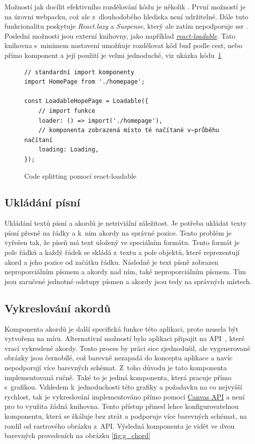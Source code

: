 Možností jak docílit efektivního rozdělování kódu je několik \cite{facebookinc_2018_codesplitting}. První možností je na úrovni webpacku, což ale z~dlouhodobého hlediska není udržitelné. Dále tuto funkcionalitu poskytuje \emph{React.lazy} a \emph{Suspense}, který ale zatím nepodporuje \acrshort{ssr} \cite{facebookinc_2018_codesplitting}. Poslední možnosti jsou externí knihovny, jako například \href{https://github.com/jamiebuilds/react-loadable}{\emph{react-loadable}}. Tato knihovna s~minimem nastavení umožňuje rozdělovat kód buď podle cest, nebo přímo komponent a její použití je velmi jednoduché, viz ukázka kódu~\ref{code:code_splitting}

\begin{figure}[h!]
    \centering
    \begin{verbatim}
// standardní import komponenty
import HomePage from './homepage';

const LoadableHopePage = Loadable({
    // import funkce
    loader: () => import('./homepage'),
    // komponenta zobrazená místo té načítané v~průběhu načítaní
    loading: Loading,
});
    \end{verbatim}
    \caption{Code splitting pomocí react-loadable}
    \label{code:code_splitting}
\end{figure}

\subsection{Ukládání písní}
\label{ss:song_saving}
Ukládání textů písní a akordů je netriviální záležitost. Je potřeba ukládat texty písní přesně na řádky a k~nim akordy na správné pozice. Tento problém je vyřešen tak, že píseň má text uložený ve speciálním formátu. Tento formát je pole řádků a každý řádek se skládá z~textu a pole objektů, které reprezentují akord a jeho pozice od začátku řádku. Následně je text písně zobrazen neproporciálním písmem a akordy nad ním, také neproporciálním písmem. Tím jsou zaručené jednotné odstupy písmen a akordy jsou tedy na správných místech.

\subsection{Vykreslování akordů}
\label{ss:chords_render}
Komponenta akordů je další specifická funkce této aplikaci, proto musela být vytvořena na míru. Alternativní možností bylo aplikaci připojit na API~\cite{a2011_ukulele}, které vrací vykreslené akordy. Tento proces by práci sice zjednodušil, ale vygenerované obrázky jsou černobílé, což barevně nezapadá do konceptu aplikace a navíc nepodporují více barevných schémat. Z~toho důvodu je tato komponenta implementovaná ručně. Také to je jediná komponenta, která pracuje přímo s~grafikou. Vzhledem k~jednoduchosti této grafiky a požadavku na co nejvyšší rychlost, tak je vykreslování implementováno přímo pomocí \href{https://developer.mozilla.org/en-US/docs/Web/API/Canvas_API}{Canvas API} a není pro to využita žádná knihovna. Tento přístup přinesl lehce konfigurovatelnou komponentu, která se škáluje bez ztrát a podporuje více barevných schémat, na rozdíl od rastrového obrázku z~API. Výsledná komponenta je vidět ve dvou barevných provedeních na obrázku \ref{fig:g_chord}

